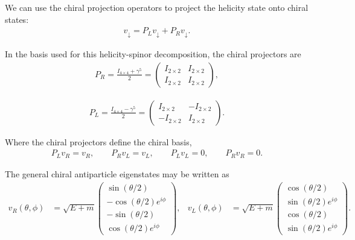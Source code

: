 We can use the chiral projection operators to project the helicity state onto chiral states:
\begin{align}
v_{\downarrow}
=
P_L v_{\downarrow}
+
P_R v_{\downarrow}.
\end{align}

In the basis used for this helicity-spinor decomposition, the chiral projectors are
\begin{align}
P_R
=
\frac{I_{4\times 4}+\gamma^5}{2}
=
\begin{pmatrix}
I_{2\times 2} & I_{2\times 2} \\
I_{2\times 2} & I_{2\times 2}
\end{pmatrix},
\end{align}

\begin{align}
P_L
=
\frac{I_{4\times 4}-\gamma^5}{2}
=
\begin{pmatrix}
I_{2\times 2} & -I_{2\times 2} \\
-I_{2\times 2} & I_{2\times 2}
\end{pmatrix}.
\end{align}

Where the chiral projectors define the chiral basis,
\begin{align}
P_L v_R = v_R,
\qquad
P_R v_L = v_L,
\qquad
P_L v_L = 0,
\qquad
P_R v_R = 0.
\end{align}

The general chiral antiparticle eigenstates may be written as
\begin{align}
v_R(\theta,\phi)
&=
\sqrt{E+m}
\begin{pmatrix}
\sin(\theta/2) \\
-\cos(\theta/2)e^{i\phi} \\
-\sin(\theta/2) \\
\cos(\theta/2)e^{i\phi}
\end{pmatrix},
&
v_L(\theta,\phi)
&=
\sqrt{E+m}
\begin{pmatrix}
\cos(\theta/2) \\
\sin(\theta/2)e^{i\phi} \\
\cos(\theta/2) \\
\sin(\theta/2)e^{i\phi}
\end{pmatrix}.
\end{align}

